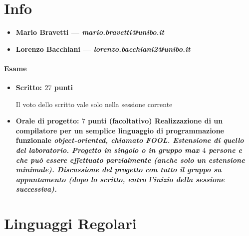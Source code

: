 \documentclass[11pt, a4paper]{article}
\begin{document}
%
\makefront{}
%
\tableofcontents
\newpage
%
\section{Info}\label{sec:info} %
\begin{itemize}
    \item \bf{Mario Bravetti} --- \it{mario.bravetti@unibo.it}
    \item \bf{Lorenzo Bacchiani} --- \it{lorenzo.bacchiani2@unibo.it}
\end{itemize}
%
\paragraph{Esame}\label{par:esame} %
\begin{itemize}
    \item \bf{Scritto}: $27$ punti
        \begin{warning}
            Il voto dello scritto vale solo nella sessione corrente
        \end{warning}
    \item \bf{Orale di progetto}: $7$ punti (facoltativo)
        Realizzazione di un \bf{compilatore} per un semplice linguaggio di programmazione funzionale \it{object-oriented}, chiamato \it{FOOL}.
        Estensione di quello del \bf{laboratorio}.
        \emptyln{}
        Progetto in singolo o in \bf{gruppo max $4$ persone} e che può essere effettuato \bf{parzialmente} (anche solo un estensione minimale).
        \emptyln{}
        Discussione del progetto con tutto il gruppo su \bf{appuntamento} (dopo lo scritto, entro l'inizio della sessione successiva).
\end{itemize}
%
%
\section{Linguaggi Regolari}\label{sec:linguaggi_regolari} %
%
\end{document}
